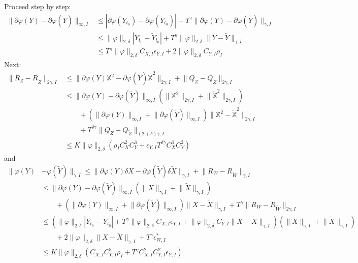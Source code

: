 \documentclass[a4paper,12pt,reqno]{amsproc}
\newcommand{\der}{\delta\!}
\newcommand{\norm}[1]{\lVert #1\rVert}
\newcommand{\wt}{\widetilde}
\begin{document}
Proceed step by step:
\begin{equation*}
  \begin{split}
  \norm{\partial \varphi(Y)-\partial \varphi(\wt Y)}_{\infty,I} 
 & \le  |\partial \varphi(Y_{t_0})-\partial \varphi(\wt Y_{t_0})|+
 T^\gamma \norm{\partial \varphi(Y)-\partial \varphi(\wt Y)}_{\gamma,I}
 \\ & \le \norm{\varphi}_{2,\delta} |Y_{t_0}-\wt Y_{t_0}| +
 T^\gamma \norm{\varphi}_{2,\delta} \norm{Y-\wt Y}_{\gamma,I}
\\ & \le 
 T^\gamma \norm{\varphi}_{2,\delta} C_{X,I} \epsilon_{Y,I} +
  2 \norm{\varphi}_{2,\delta} C_{Y,I} \rho_I
  \end{split}
\end{equation*}
Next:
\begin{equation*}
  \begin{split}
 \norm{R_Z-R_{\wt Z}}_{2\gamma,I} & \le  \norm{\partial
 \varphi(Y)\mathbb{X}^2-\partial \varphi(\wt Y)\mathbb{\wt X}^2
 }_{2\gamma,I} 
+  \norm{Q_Z-Q_{\wt Z}}_{2\gamma,I}  
\\ & \le
 \norm{\partial
 \varphi(Y)-\partial \varphi(\wt Y)
 }_{\infty,I} (\norm{\mathbb{X}^2}_{2\gamma,I}+\norm{\mathbb{\wt
 X}^2}_{2\gamma,I} ) 
\\ &\qquad + (\norm{\partial
 \varphi(Y)}_{\infty,I}+\norm{\partial \varphi(\wt Y)}_{\infty,I})
\norm{\mathbb{X}^2-\mathbb{\wt
 X}^2}_{2\gamma,I}
\\ &\qquad+ T^{\delta\gamma} \norm{Q_Z-Q_{\wt Z}}_{(2+\delta)\gamma,I}  
\\ & \le K \norm{\varphi}_{2,\delta}(\rho_I C_X^2 C_Y^3 + \epsilon_{Y,I} T^{\delta \gamma}
 C_X^3 C_Y^2)
  \end{split}
\end{equation*}
and
\begin{equation*}
  \begin{split}
     \norm{\varphi(Y)&-\varphi(\wt Y)}_{\gamma,I}  \le
\norm{\partial \varphi(Y) \der X - \partial \varphi(\wt Y)\der \wt
  X}_{\gamma,I} + \norm{R_W-R_{\wt W}}_{\gamma,I}
\\ & \le  
\norm{\partial \varphi(Y)  - \partial \varphi(\wt
  Y)}_{\infty,I}(\norm{X}_{\gamma,I}+\norm{\wt X}_{\gamma,I})
\\ & \qquad +
(\norm{\partial \varphi(Y) }_{\infty,I}+\norm{\partial \varphi(\wt Y)
}_{\infty,I}) \norm{X-\wt X}_{\gamma,I}+ T^\gamma \norm{R_W-R_{\wt
    W}}_{2\gamma,I}
\\ & \le
 (\norm{\varphi}_{2,\delta} |Y_{t_0}-\wt Y_{t_0}| +
 T^\gamma \norm{\varphi}_{2,\delta} C_{X,I} \epsilon_{Y,I} +
 \norm{\varphi}_{2,\delta} C_{Y,I} \norm{X-\wt
   X}_{\gamma,I})(\norm{X}_{\gamma,I}+\norm{\wt X}_{\gamma,I})
\\ & \qquad +2
 \norm{\varphi}_{2,\delta}  \norm{X-\wt X}_{\gamma,I}+ T^\gamma
 \epsilon_{W,I}^*
\\ & \le K \norm{\varphi}_{2,\delta}(C_{X,I} C_{Y,I}^3 \rho_I + T^\gamma C_{X,I}^2 C_{Y,I}^2 \epsilon_{Y,I})
  \end{split}
\end{equation*}
\end{document}
